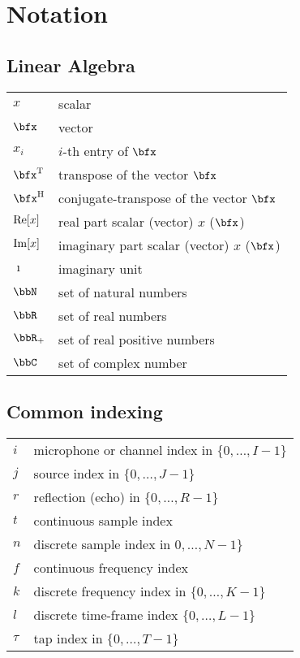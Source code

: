 \chapter*{Notation}


\section*{Linear Algebra}
\begin{table}[H]
    \begin{tabular}{ll}
        $x$     & scalar      \\
        $\bfx$  & vector      \\
        $x_i$   & $i$-th entry of $\bfx$ \\
        $\ktranspose{\bfx}$   & transpose of the vector $\bfx$ \\
        $\khermitian{\bfx}$   & conjugate-transpose of the vector $\bfx$ \\
        $\operatorname{Re}[x]$ & real part scalar (vector) $x$ ($\bfx$) \\
        $\operatorname{Im}[x]$ & imaginary part scalar (vector) $x$ ($\bfx$) \\
        $\imath$     & imaginary unit \\
        $\bbN$    & set of natural numbers \\
        $\bbR$    & set of real numbers \\
        $\bbR_{+}$    & set of real positive numbers \\
        $\bbC$    & set of complex number \\
    \end{tabular}
\end{table}

\section*{Common indexing}
\begin{table}[H]
    \begin{tabular}{ll}
        $i$     & microphone or channel index in $\{0, \dots, I-1\}$      \\
        $j$     & source index in $\{0, \dots, J-1\}$      \\
        $r$     & reflection (echo) in $\{0, \dots, R-1\}$      \\
        $t$     & continuous sample index\\
        $n$     & discrete sample index in $0, \dots, N-1\}$ \\
        $f$     & continuous frequency index \\
        $k$     & discrete frequency index in $\{0, \dots, K-1\}$ \\
        $l$     & discrete time-frame index $\{0, \dots, L-1\}$\\
        $\tau$  & tap index in $\{0, \dots, T-1\}$\\
    \end{tabular}
\end{table}

